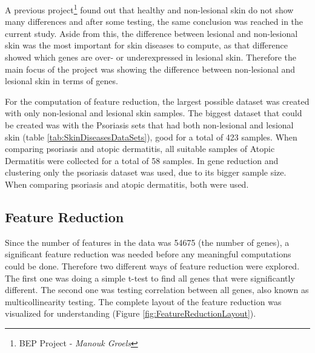 \documentclass[10pt,a4paper]{report}
\begin{document}
	A previous project\footnote{BEP Project -\textit{ Manouk Groels}} found out that healthy and non-lesional skin do not show many differences and after some testing, the same conclusion was reached in the current study. Aside from this, the difference between lesional and non-lesional skin was the most important for skin diseases to compute, as that difference showed which genes are over- or underexpressed in lesional skin. Therefore the main focus of the project was showing the difference between non-lesional and lesional skin in terms of genes. 
	
	For the computation of feature reduction, the largest possible dataset was created with only non-lesional and lesional skin samples. The biggest dataset that could be created was with the Psoriasis sets that had both non-lesional and lesional skin (table \ref{tab:SkinDiseasesDataSets}), good for a total of 423 samples. When comparing psoriasis and atopic dermatitis, all suitable samples of Atopic Dermatitis were collected for a total of 58 samples. In gene reduction and clustering only the psoriasis dataset was used, due to its bigger sample size. When comparing psoriasis and atopic dermatitis, both were used.
	
	\subsection{Feature Reduction}
	\label{subsec:MethodsFeatureReduction}
	
	Since the number of features in the data was 54675 (the number of genes), a significant feature reduction was needed before any meaningful computations could be done. Therefore two different ways of feature reduction were explored. The first one was doing a simple t-test to find all genes that were significantly different. The second one was testing correlation between all genes, also known as multicollinearity testing. The complete layout of the feature reduction was visualized for understanding (Figure \ref{fig:FeatureReductionLayout}).
	
\end{document}
